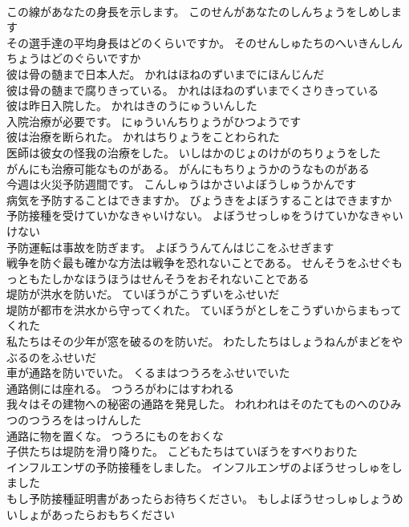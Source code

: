 \documentclass[8pt]{extreport}
\begin{document}
\begin{CJK}{UTF8}{min}
\\	この線があなたの身長を示します。	このせんがあなたのしんちょうをしめします 
\\	その選手達の平均身長はどのくらいですか。	そのせんしゅたちのへいきんしんちょうはどのぐらいですか 
\\	彼は骨の髄まで日本人だ。	かれはほねのずいまでにほんじんだ 
\\	彼は骨の髄まで腐りきっている。	かれはほねのずいまでくさりきっている 
\\	彼は昨日入院した。	かれはきのうにゅういんした 
\\	入院治療が必要です。	にゅういんちりょうがひつようです 
\\	彼は治療を断られた。	かれはちりょうをことわられた 
\\	医師は彼女の怪我の治療をした。	いしはかのじょのけがのちりょうをした 
\\	がんにも治療可能なものがある。	がんにもちりょうかのうなものがある 
\\	今週は火災予防週間です。	こんしゅうはかさいよぼうしゅうかんです 
\\	病気を予防することはできますか。	びょうきをよぼうすることはできますか 
\\	予防接種を受けていかなきゃいけない。	よぼうせっしゅをうけていかなきゃいけない 
\\	予防運転は事故を防ぎます。	よぼううんてんはじこをふせぎます 
\\	戦争を防ぐ最も確かな方法は戦争を恐れないことである。	せんそうをふせぐもっともたしかなほうほうはせんそうをおそれないことである 
\\	堤防が洪水を防いだ。	ていぼうがこうずいをふせいだ 
\\	堤防が都市を洪水から守ってくれた。	ていぼうがとしをこうずいからまもってくれた 
\\	私たちはその少年が窓を破るのを防いだ。	わたしたちはしょうねんがまどをやぶるのをふせいだ 
\\	車が通路を防いでいた。	くるまはつうろをふせいでいた 
\\	通路側には座れる。	つうろがわにはすわれる 
\\	我々はその建物への秘密の通路を発見した。	われわれはそのたてものへのひみつのつうろをはっけんした 
\\	通路に物を置くな。	つうろにものをおくな 
\\	子供たちは堤防を滑り降りた。	こどもたちはていぼうをすべりおりた 
\\	インフルエンザの予防接種をしました。	インフルエンザのよぼうせっしゅをしました 
\\	もし予防接種証明書があったらお待ちください。	もしよぼうせっしゅしょうめいしょがあったらおもちください 

\end{CJK}
\end{document}
